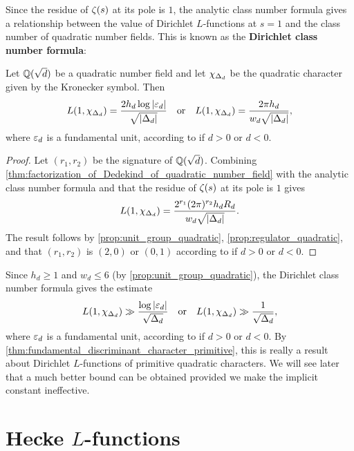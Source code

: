       Since the residue of $\zeta(s)$ at its pole is $1$, the analytic class number formula gives a relationship between the value of Dirichlet $L$-functions at $s = 1$ and the class number of quadratic number fields. This is known as the \textbf{Dirichlet class number formula}:

      \begin{corollary}
        Let $\mathbb{Q}(\sqrt{d})$ be a quadratic number field and let $\chi_{\Delta_{d}}$ be the quadratic character given by the Kronecker symbol. Then
        \[
          L(1,\chi_{\Delta_{d}}) = \frac{2h_{d}\log|\varepsilon_{d}|}{\sqrt{|\Delta_{d}|}} \quad \text{or} \quad L(1,\chi_{\Delta_{d}}) = \frac{2\pi h_{d}}{w_{d}\sqrt{|\Delta_{d}|}},
        \]
        where $\varepsilon_{d}$ is a fundamental unit, according to if $d > 0$ or $d < 0$.
      \end{corollary}
      \begin{proof}
        Let $(r_{1},r_{2})$ be the signature of $\mathbb{Q}(\sqrt{d})$. Combining \cref{thm:factorization_of_Dedekind_of_quadratic_number_field} with the analytic class number formula and that the residue of $\zeta(s)$ at its pole is $1$ gives
        \[
          L(1,\chi_{\Delta_{d}}) = \frac{2^{r_{1}}(2\pi)^{r_{2}}h_{d}R_{d}}{w_{d}\sqrt{|\Delta_{d}|}}.
        \]
        The result follows by \cref{prop:unit_group_quadratic}, \cref{prop:regulator_quadratic}, and that $(r_{1},r_{2})$ is $(2,0)$ or $(0,1)$ according to if $d > 0$ or $d < 0$.
      \end{proof}
      
      Since $h_{d} \ge 1$ and $w_{d} \le 6$ (by \cref{prop:unit_group_quadratic}), the Dirichlet class number formula gives the estimate
      \begin{equation}\label{equ:lower_bound_at_1_Dirichlet_real_character}
        L(1,\chi_{\Delta_{d}}) \gg \frac{\log|\varepsilon_{d}|}{\sqrt{\Delta_{d}}} \quad \text{or} \quad L(1,\chi_{\Delta_{d}}) \gg \frac{1}{\sqrt{\Delta_{d}}},
      \end{equation}
      where $\varepsilon_{d}$ is a fundamental unit, according to if $d > 0$ or $d < 0$. By \cref{thm:fundamental_discriminant_character_primitive}, this is really a result about Dirichlet $L$-functions of primitive quadratic characters. We will see later that a much better bound can be obtained provided we make the implicit constant ineffective.
  \section{Hecke \texorpdfstring{$L$}{L}-functions}
